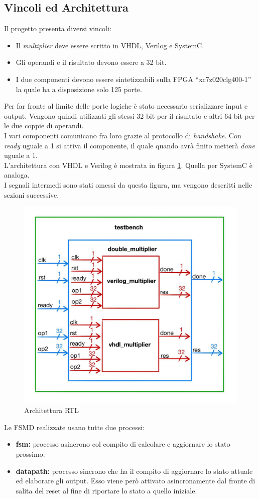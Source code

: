 \documentclass[]{IEEEtran}
\begin{document}
\subsection{Vincoli ed Architettura}
Il progetto presenta diversi vincoli:
\begin{itemize}
    \item Il \textit{multiplier} deve essere scritto in VHDL, Verilog e SystemC.
    \item Gli operandi e il risultato devono essere a 32 bit.
    \item I due componenti devono essere sintetizzabili sulla FPGA ``xc7z020clg400-1'' la quale ha a disposizione solo 125 porte.
\end{itemize}
Per far fronte al limite delle porte logiche è stato necessario serializzare input e output. Vengono quindi utilizzati gli stessi 32 bit per il risultato e altri 64 bit per le due coppie di operandi.
\\I vari componenti comunicano fra loro grazie al protocollo di \textit{handshake}. Con \textit{ready} uguale a 1 si attiva il componente, il quale quando avrà finito metterà \textit{done} uguale a 1.
\\L'architettura con VHDL e Verilog è mostrata in figura \ref{fig:Architettura}. Quella per SystemC è analoga.
\\I segnali intermedi sono stati omessi da questa figura, ma vengono descritti nelle sezioni successive.
\begin{figure}[!htb]
    \centering
    \includegraphics[width=0.8\linewidth]{figures/architettura}
    \caption{Architettura RTL}
    \label{fig:Architettura}
\end{figure}
Le FSMD realizzate usano tutte due processi:
\begin{itemize}
    \item \textbf{fsm:} processo asincrono col compito di calcolare e aggiornare lo stato prossimo.
    \item \textbf{datapath:} processo sincrono che ha il compito di aggiornare lo stato attuale ed elaborare gli output. Esso viene però attivato asincronamente dal fronte di salita del reset al fine di riportare lo stato a quello iniziale.
\end{itemize}
\end{document}
